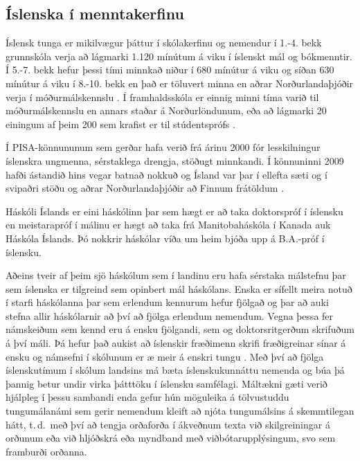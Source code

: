 \begin{multicols}{2}
\subsection{Íslenska í menntakerfinu}

Íslensk tunga er mikilvægur þáttur í skólakerfinu og nemendur í 1.-4. bekk grunnskóla verja að lágmarki 1.120 mínútum á viku í íslenskt mál og bókmenntir. Í 5.-7. bekk hefur þessi tími minnkað niður í 680 mínútur á viku og síðan 630 mínútur á viku í 8.-10. bekk en það er töluvert minna en aðrar Norðurlandaþjóðir verja í móðurmálskennslu \cite{men2}. Í framhaldsskóla er einnig minni tíma varið til móðurmálskennslu en annars staðar á Norðurlöndunum, eða að lágmarki 20 einingum af þeim 200 sem krafist er til stúdentsprófs \cite{men3}. 

Í PISA-könnununum sem gerðar hafa verið frá árinu 2000 fór lesskilningur íslenskra ungmenna, sérstaklega drengja, stöðugt minnkandi. Í könnuninni 2009 hafði ástandið hins vegar batnað nokkuð og Ísland var þar í ellefta sæti og í svipaðri stöðu og aðrar Norðurlandaþjóðir að Finnum frátöldum \cite{nam1}.

Háskóli Íslands er eini háskólinn þar sem hægt er að taka doktorspróf í íslensku en meistarapróf í málinu er hægt að taka frá Manitobaháskóla í Kanada auk Háskóla Íslands. Þó nokkrir háskólar víða um heim bjóða upp á B.A.-próf í íslensku.

Aðeins tveir af þeim sjö háskólum sem í landinu eru hafa sérstaka málstefnu þar sem íslenska er tilgreind sem opinbert mál háskólans. Enska er sífellt meira notuð í starfi háskólanna þar sem erlendum kennurum hefur fjölgað og þar að auki stefna allir háskólarnir að því að fjölga erlendum nemendum. Vegna þessa fer námskeiðum sem kennd eru á ensku fjölgandi, sem og doktorsritgerðum skrifuðum á því máli. Þá hefur það aukist að íslenskir fræðimenn skrifi fræðigreinar sínar á ensku og námsefni í skólunum er æ meir á enskri tungu \cite{isl1}. 
Með því að fjölga íslenskutímum í skólum landsins má bæta íslenskukunnáttu nemenda og búa þá þannig betur undir virka þátttöku í íslensku samfélagi. 
Máltækni gæti verið hjálpleg í þessu sambandi enda gefur hún möguleika á tölvustuddu tungumálanámi sem gerir nemendum kleift að njóta tungumálsins á skemmtilegan hátt, t.\,d.~með því að tengja orðaforða í ákveðnum texta við skilgreiningar á orðunum eða við hljóðskrá eða myndband með viðbótarupplýsingum, svo sem framburði orðanna.


\end{multicols}
